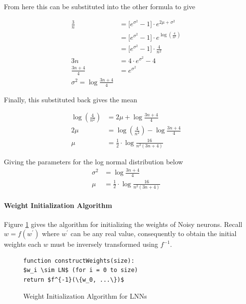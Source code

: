 From here this can be substituted into the other formula to give

\begin{align*}
\frac{3}{n} &= \big[e^{\sigma^2} - 1\big] \cdot e^{2\mu + \sigma^2}\\
&= \big[e^{\sigma^2} - 1\big] \cdot e^{\log(\frac{4}{n^2})}\\
&= \big[e^{\sigma^2} - 1\big] \cdot \frac{4}{n^2}\\
3n &= 4 \cdot e^{\sigma^2} - 4\\
\frac{3n + 4}{4} &= e^{\sigma^2}\\
\sigma^2 = \log \frac{3n + 4}{4}
\end{align*}

Finally, this substituted back gives the mean

\begin{align*}
\log(\frac{4}{n^2}) &= 2\mu + \log \frac{3n + 4}{4}\\
2\mu &= \log(\frac{4}{n^2}) - \log \frac{3n + 4}{4}\\
\mu &= \frac{1}{2} \cdot \log \frac{16}{n^2(3n + 4)}
\end{align*}

Giving the parameters for the log normal distribution below
\begin{align}
\sigma^2 &= \log \frac{3n + 4}{4}\\
\mu &= \frac{1}{2} \cdot \log \frac{16}{n^2(3n + 4)}
\end{align}


\noindent
\begin{minipage}[t]{0.48\textwidth}
\vspace{0px}
\paragraph{Weight Initialization Algorithm}
Figure \ref{alg:lnn-initlization} gives the algorithm for initializing the weights of Noisy neurons. Recall $w = f(w^{'})$ where $w^{'}$ can be any real value, consequently to obtain the initial weights each $w$ must be inversely transformed using $f^{-1}$.
\end{minipage}
\hspace{0.05\textwidth}
\begin{minipage}[t]{0.47\textwidth}
\vspace{0px}
\begin{figure}[H]
	\begin{lstlisting}[mathescape=true]
function constructWeights(size):
$w_i \sim LN$ (for i = 0 to size)
return $f^{-1}(\{w_0, ...\})$
\end{lstlisting}
	\caption{Weight Initialization Algorithm for LNNs}
	\label{alg:lnn-initlization}
\end{figure}
\end{minipage}

